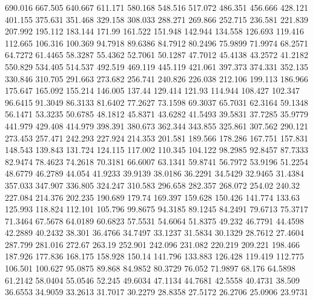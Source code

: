 690.016      667.505      640.667      611.171      580.168      548.516      517.072      486.351      456.666      428.121      401.155      375.631      351.468      329.158      308.033      288.271      269.866      252.715      236.581      221.839      207.992      195.112      183.144      171.99      161.522      151.948      142.944      134.558      126.693      119.416      112.665      106.316      100.369      94.7918      89.6386      84.7912      80.2496      75.9899      71.9974      68.2571      64.7272      61.4465      58.3287      55.4362      52.7061      50.1287      47.7012      45.4138      43.2572      41.2182      
550.829      534.405      514.537      492.519      469.119      445.119      421.061      397.373      374.331      352.135      330.846      310.705      291.663      273.682      256.741      240.826      226.038      212.106      199.113      186.966      175.647      165.092      155.214      146.005      137.44      129.414      121.93      114.944      108.427      102.347      96.6415      91.3049      86.3133      81.6402      77.2627      73.1598      69.3037      65.7031      62.3164      59.1348      56.1471      53.3235      50.6785      48.1812      45.8371      43.6282      41.5493      39.5831      37.7285      35.9779      
441.979      429.408      414.979      398.391      380.673      362.344      343.855      325.861      307.562      290.121      273.453      257.471      242.293      227.924      214.353      201.581      189.566      178.286      167.751      157.831      148.543      139.843      131.724      124.115      117.002      110.345      104.122      98.2985      92.8457      87.7333      82.9474      78.4623      74.2618      70.3181      66.6007      63.1341      59.8741      56.7972      53.9196      51.2254      48.6779      46.2789      44.054      41.9233      39.9139      38.0186      36.2291      34.5429      32.9465      31.4384      
357.033      347.907      336.805      324.247      310.583      296.658      282.357      268.072      254.02      240.32      227.084      214.376      202.235      190.689      179.74      169.397      159.628      150.426      141.774      133.63      125.993      118.824      112.101      105.796      99.8675      94.3185      89.1245      84.2491      79.6713      75.3717      71.3464      67.5678      64.0189      60.6823      57.5531      54.6064      51.8375      49.232      46.7791      44.4598      42.2889      40.2432      38.301      36.4766      34.7497      33.1237      31.5834      30.1329      28.7612      27.4604      
287.799      281.016      272.67      263.19      252.901      242.096      231.082      220.219      209.221      198.466      187.926      177.836      168.175      158.928      150.14      141.796      133.883      126.428      119.419      112.775      106.501      100.627      95.0875      89.868      84.9852      80.3729      76.052      71.9897      68.176      64.5898      61.2142      58.0404      55.0546      52.245      49.6034      47.1134      44.7681      42.5558      40.4731      38.509      36.6553      34.9059      33.2613      31.7017      30.2279      28.8358      27.5172      26.2706      25.0906      23.9731      

